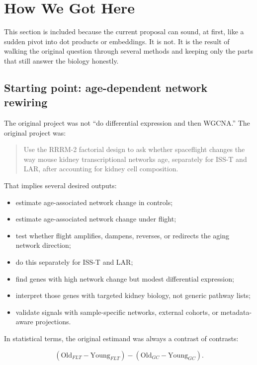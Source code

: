 \documentclass[11pt]{article}
\begin{document}
\section{How We Got Here}

This section is included because the current proposal can sound, at first, like
a sudden pivot into dot products or embeddings. It is not. It is the result of
walking the original question through several methods and keeping only the parts
that still answer the biology honestly.

\subsection{Starting point: age-dependent network rewiring}

The original project was not ``do differential expression and then WGCNA.'' The
original project was:

\begin{quote}
Use the RRRM-2 factorial design to ask whether spaceflight changes the way mouse
kidney transcriptional networks age, separately for ISS-T and LAR, after
accounting for kidney cell composition.
\end{quote}

That implies several desired outputs:

\begin{itemize}
  \item estimate age-associated network change in controls;
  \item estimate age-associated network change under flight;
  \item test whether flight amplifies, dampens, reverses, or redirects the aging
        network direction;
  \item do this separately for ISS-T and LAR;
  \item find genes with high network change but modest differential expression;
  \item interpret those genes with targeted kidney biology, not generic pathway
        lists;
  \item validate signals with sample-specific networks, external cohorts, or
        metadata-aware projections.
\end{itemize}

In statistical terms, the original estimand was always a contrast of contrasts:

\[
  \left(\mathrm{Old}_{FLT}-\mathrm{Young}_{FLT}\right)
  -
  \left(\mathrm{Old}_{GC}-\mathrm{Young}_{GC}\right).
\]
\end{document}
